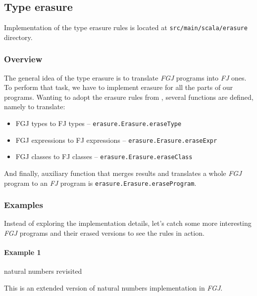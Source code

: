 \documentclass{article}[12pt]
\begin{document}
\subsection{Type erasure}

Implementation of the type erasure rules is located at
\texttt{src/main/scala/erasure} directory.

\subsubsection{Overview}

The general idea of the type erasure is to translate \emph{FGJ}
programs into \emph{FJ} ones. To perform that task, we have to
implement erasure for all the parts of our programs. Wanting to adopt
the erasure rules from \cite{fj}, several functions are defined,
namely to translate:

\begin{itemize}
\item FGJ types to FJ types -- \texttt{erasure.Erasure.eraseType}
\item FGJ expressions to FJ expressions --
  \texttt{erasure.Erasure.eraseExpr}
\item FGJ classes to FJ classes -- \texttt{erasure.Erasure.eraseClass}
\end{itemize}
And finally, auxiliary function that merges results and translates a
whole \emph{FGJ} program to an \emph{FJ} program is
\texttt{erasure.Erasure.eraseProgram}.

\subsubsection{Examples}

Instead of exploring the implementation details, let's catch some more
interesting \emph{FGJ} programs and their erased versions to see
the rules in action.

\paragraph{Example 1} natural numbers revisited

This is an extended version of natural numbers implementation in
\emph{FGJ}.
\end{document}
